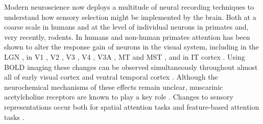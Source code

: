 Modern neuroscience now deploys a multitude of neural recording techniques to understand how sensory selection might be implemented by the brain. Both at a coarse scale in humans and at the level of individual neurons in primates and, very recently, rodents. In humans and non-human primates attention has been shown to alter the response gain of neurons in the visual system, including in the LGN \citep{OConnor2002-mx}, in V1 \citep{Motter1993-av}, V2 \citep{Buffalo2010-lr,Luck1997-sq,Motter1993-av}, V3 \citep{Liu2007-jx,Pestilli2011-gi,Saenz2002-fs,Silver2007-vd}, V4 \citep{Buffalo2010-lr,Connor1996-nm,Luck1997-sq,McAdams1999-jy,Moran1985-cv,Motter1993-av,Reynolds2000-mg,Spitzer1988-ib}, V3A \citep{Serences2007-le},  MT \citep{Beauchamp1997-rh,OCraven1997-ej,Saenz2002-fs,Seidemann1999-oz,Serences2007-le,Treue1999-mp,Treue1996-ez} and MST \citep{OCraven1997-ej,Treue1996-ez}, and in IT cortex \citep{Chelazzi1998-gx,Moran1985-cv}. Using BOLD imaging these changes can be observed simultaneously throughout almost all of early visual cortex \citep{Liu2007-jx,Pestilli2011-gi,Saenz2002-fs,Silver2007-vd} and ventral temporal cortex \citep{Baldauf2014-uj}. Although the neurochemical mechanisms of these effects remain unclear, muscarinic acetylcholine receptors are known to play a key role \citep{Herrero2008-am}. Changes to sensory representations occur both for spatial attention tasks \citep{Klein2014-oe,McAdams1999-jy,Mitchell2009-do,Pestilli2011-gi,Womelsdorf2006-np} and feature-based attention tasks \citep{Baldauf2014-uj,Harel2014-wd,Huk2000-uj,Jehee2011-mb,Saenz2002-fs,Saenz2003-qz,Serences2007-le,Treue1999-mp}.


